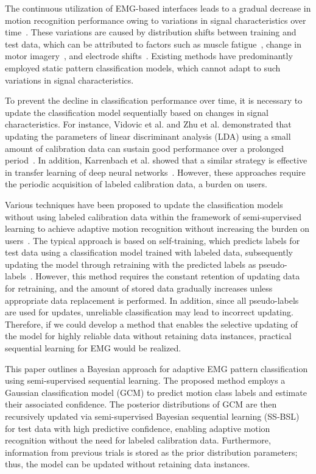 \documentclass[letterpaper, 10 pt, conference]{ieeeconf}
\begin{document}
The continuous utilization of EMG-based interfaces leads to a gradual decrease in motion recognition performance owing to variations in signal characteristics over time~\cite{sensinger2009adaptive,zhang2017robust}.
These variations are caused by distribution shifts between training and test data, which can be attributed to factors such as muscle fatigue~\cite{artemiadis2010emg}, change in motor imagery~\cite{samuel2017resolving}, and electrode shifts~\cite{betthauser2017limb,fougner2011resolving}.
Existing methods have predominantly employed static pattern classification models, which cannot adapt to such variations in signal characteristics.

To prevent the decline in classification performance over time, it is necessary to update the classification model sequentially based on changes in signal characteristics. 
For instance, Vidovic et al. and Zhu et al. demonstrated that updating the parameters of linear discriminant analysis (LDA) using a small amount of calibration data can sustain good performance over a prolonged period~\cite{vidovic2015improving,zhu2016cascaded}. 
In addition, Karrenbach et al. showed that a similar strategy is effective in transfer learning of deep neural networks~\cite{karrenbach2022deep}. 
However, these approaches require the periodic acquisition of labeled calibration data, a burden on users.

Various techniques have been proposed to update the classification models without using labeled calibration data within the framework of semi-supervised learning to achieve adaptive motion recognition without increasing the burden on users~\cite{zhang2013adaptation,okawa2022sequential,8692622,amsuss2013self,huang2017novel}. 
The typical approach is based on self-training, which predicts labels for test data using a classification model trained with labeled data, subsequently updating the model through retraining with the predicted labels as pseudo-labels~\cite{zhang2013adaptation,okawa2022sequential}. 
However, this method requires the constant retention of updating data for retraining, and the amount of stored data gradually increases unless appropriate data replacement is performed. 
In addition, since all pseudo-labels are used for updates, unreliable classification may lead to incorrect updating.
Therefore, if we could develop a method that enables the selective updating of the model for highly reliable data without retaining data instances, practical sequential learning for EMG would be realized.

This paper outlines a Bayesian approach for adaptive EMG pattern classification using semi-supervised sequential learning.
The proposed method employs a Gaussian classification model (GCM) to predict motion class labels and estimate their associated confidence.
The posterior distributions of GCM are then recursively updated via semi-supervised Bayesian sequential learning (SS-BSL) for test data with high predictive confidence, enabling adaptive motion recognition without the need for labeled calibration data.
Furthermore, information from previous trials is stored as the prior distribution parameters; thus, the model can be updated without retaining data instances.
\end{document}
